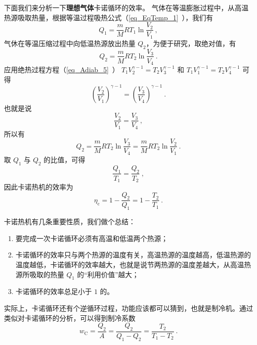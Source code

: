 下面我们来分析一下\textbf{理想气体}卡诺循环的效率。 气体在等温膨胀过程中，从高温热源吸取热量，根据等温过程吸热公式（\autoref{eq_EqTemp_1}~），我们有
\begin{equation}\label{eq_Carnot_1}
Q_{1}=\frac{m}{M} R T_{1} \ln \frac{V_{2}}{V_{1}}~,
\end{equation}
气休在等温压缩过程中向低温热源放出热量 $Q_2$，为便于研究，取绝对值，有
\begin{equation}\label{eq_Carnot_2}
Q_{2}=\frac{m}{M} R T_{2} \ln \frac{V_{3}}{V_{4}}~.
\end{equation}
应用绝热过程方程（\autoref{eq_Adiab_5}~） $T_{1} V_{2}^{\gamma-1}=T_{2} V_{3}^{\gamma-1}$ 和 $T_{1} V_{1}^{\gamma-1}=T_{2} V_{4}^{\gamma-1}$ 可得
\begin{equation}
\left(\frac{V_{2}}{V_{1}}\right)^{\gamma-1}=\left(\frac{V_{3}}{V_{4}}\right)^{\gamma-1}~.
\end{equation}
也就是说
\begin{equation}\label{eq_Carnot_3}
\frac{V_{2}}{V_{1}}=\frac{V_{3}}{V_{4}}~,
\end{equation}
所以有
\begin{equation}
Q_{2}=\frac{m}{M} R T_{2} \ln \frac{V_{3}}{V_{4}}=\frac{m}{M} R T_{2} \ln \frac{V_{2}}{V_{1}}~.
\end{equation}
取 $Q_1$ 与 $Q_2$ 的比值，可得
\begin{equation}\label{eq_Carnot_4}
\frac{Q_{1}}{T_{1}}=\frac{Q_{2}}{T_{2}}~,
\end{equation}
因此卡诺热机的效率为
\begin{equation}
\eta_{\mathrm{c}}=1-\frac{Q_{2}}{Q_{1}}=1-\frac{T_{2}}{T_{1}}~.
\end{equation}


卡诺热机有几条重要性质，我们做个总结：
\begin{enumerate}
\item 要完成一次卡诺循环必须有高温和低温两个热源；
\item 卡诺循环的效率只与两个热源的温度有关，高温热源的温度越高，低温热源的温度越低，卡诺循环的效率越大，也就是说节两热源的温度差越大，从高温热源所吸取的热量 $Q_1$ 的“利用价值”越大；
\item 卡诺循环的效率总足小于 $1 $ 的。
\end{enumerate}

实际上，卡诺循环还有个逆循环过程，功能应该都可以猜到，也就是制冷机。通过类似对卡诺循环的分析，可以得到制冷系数
\begin{equation}
w_{\mathrm{C}}=\frac{Q_{2}}{A}=\frac{Q_{2}}{Q_{1}-Q_{2}}=\frac{T_{2}}{T_{1}-T_{2}}~.
\end{equation}

